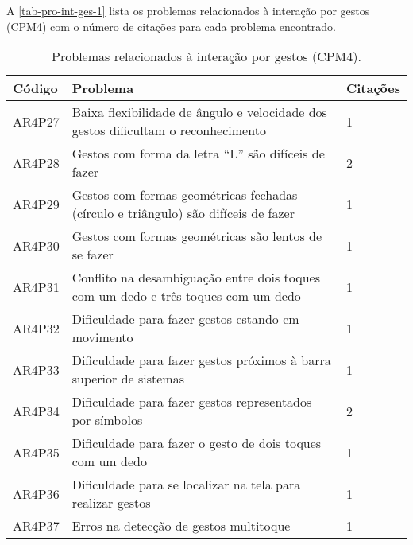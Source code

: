A \autoref{tab-pro-int-ges-1} lista os problemas relacionados à interação por gestos (CPM4) com o número de citações para cada problema encontrado.

\begin{table}[htb]
  \begin{center}
    \ABNTEXfontereduzida
    \caption{Problemas relacionados à interação por gestos (CPM4).}
    \label{tab-pro-int-ges-1}
    \begin{tabular}{p{1.2cm}|p{12.0cm}|p{1.2cm}}
      \textbf{Código} & \textbf{Problema}                                                                  & \textbf{Citações} \\
      \hline
      AR4P27          & Baixa flexibilidade de ângulo e velocidade dos gestos dificultam o reconhecimento  & 1                 \\
      \hline
      AR4P28          & Gestos com forma da letra “L” são difíceis de fazer                                & 2                 \\
      \hline
      AR4P29          & Gestos com formas geométricas fechadas (círculo e triângulo) são difíceis de fazer & 1                 \\
      \hline
      AR4P30          & Gestos com formas geométricas são lentos de se fazer                               & 1                 \\
      \hline
      AR4P31          & Conflito na desambiguação entre dois toques com um dedo e três toques com um dedo  & 1                 \\
      \hline
      AR4P32          & Dificuldade para fazer gestos estando em movimento                                 & 1                 \\
      \hline
      AR4P33          & Dificuldade para fazer gestos próximos à barra superior de sistemas                & 1                 \\
      \hline
      AR4P34          & Dificuldade para fazer gestos representados por símbolos                           & 2                 \\
      \hline
      AR4P35          & Dificuldade para fazer o gesto de dois toques com um dedo                          & 1                 \\
      \hline
      AR4P36          & Dificuldade para se localizar na tela para realizar gestos                         & 1                 \\
      \hline
      AR4P37          & Erros na detecção de gestos multitoque                                             & 1                 \\

\end{tabular}
\end{center}
\end{table}
